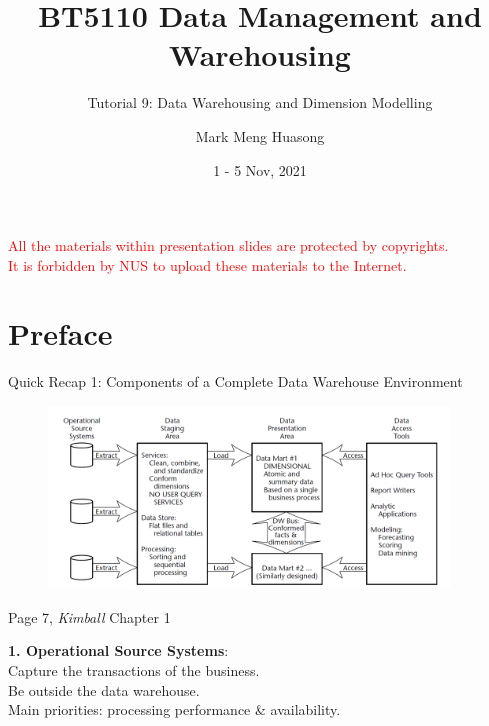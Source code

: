 \title{BT5110 Data Management and Warehousing}

\subtitle{Tutorial 9: Data Warehousing and Dimension Modelling}

\author{Mark Meng Huasong}



\date{1 - 5 Nov, 2021}

\begin{frame}
	\titlepage
	\begin{tcolorbox}
		\begin{center}
			{\scriptsize \textcolor{red}{All the materials within presentation slides are protected by copyrights.\\
					It is forbidden by NUS to upload these materials to the Internet.}}
		\end{center}
	\end{tcolorbox}
\end{frame}

\section*{Preface}

\begin{frame}[fragile]{Quick Recap 1: Components of a Complete Data Warehouse Environment}
\vspace{-10pt}\begin{figure}
	\includegraphics[width=0.95\textwidth, trim=0 0 0 0, clip]{t9/images/four-components.png}
\end{figure}\vspace{-10pt}
\begin{center}
{\scriptsize Page 7, \textit{Kimball} Chapter 1}\\
\end{center}
\textbf{1. Operational Source Systems}:\\
Capture the transactions of the business.\\
Be outside the data warehouse.\\
Main priorities: processing performance \& availability. 
\end{frame}

